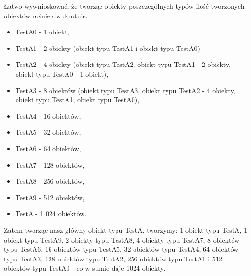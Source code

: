 \documentclass[12pt]{article}
\begin{document}
Łatwo wywnioskować, że tworząc obiekty poszczególnych typów ilość tworzonych obiektów rośnie dwukrotnie:
\begin{itemize}
	\item TestA0 - 1 obiekt,
	\item TestA1 - 2 obiekty (obiekt typu TestA1 i obiekt typu TestA0),
	\item TestA2 - 4 obiekty (obiekt typu TestA2, obiekt typu TestA1 - 2 obiekty, obiekt typu TestA0 - 1 obiekt),
	\item TestA3 - 8 obiektów (obiekt typu TestA3, obiekt typu TestA2 - 4 obiekty, obiekt typu TestA1, obiekt typu TestA0),
	\item TestA4 - 16 obiektów,
	\item TestA5 - 32 obiektów,
	\item TestA6 - 64 obiektów,
	\item TestA7 - 128 obiektów,
	\item TestA8 - 256 obiektów,
	\item TestA9 - 512 obiektów,
	\item TestA - 1 024 obiektów.
\end{itemize}
Zatem tworząc nasz główny obiekt typu TestA, tworzymy: 1 obiekt typu TestA, 1 obiekt typu TestA9, 2 obiekty typu TestA8, 4 obiekty typu TestA7, 8 obiektów typu TestA6, 16 obiektów typu TestA5, 32 obiektów typu TestA4, 64 obiektów typu TestA3, 128 obiektów typu TestA2, 256 obiektów typu TestA1 i 512 obiektów typu TestA0 - co w sumie daje 1024 obiekty.
\end{document}
